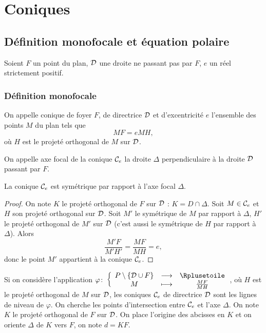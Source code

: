 \chapter{Coniques}
\minitoc
\minilof
\minilot
\section{Définition monofocale et équation polaire}
Soient $F$ un point du plan, $\mathcal{D}$ une droite ne passant pas par $F$, $e$ un réel strictement positif.
\subsection{Définition monofocale}
\begin{defdef}
   On appelle conique de foyer $F$, de directrice $\mathcal{D}$ et d'excentricité $e$ l'ensemble des points $M$ du plan tels que
  \begin{equation}
    MF=e MH,
  \end{equation}
  où $H$ est le projeté orthogonal de $M$ sur $\mathcal{D}$.
\end{defdef}
\begin{defdef}
  On appelle axe focal de la conique $\mathcal{C}_e$ la droite $\Delta$ perpendiculaire à la droite $\mathcal{D}$ passant par $F$.
\end{defdef}
\begin{prop}
  La conique $\mathcal{C}_e$ est symétrique par rapport à l'axe focal $\Delta$.
\end{prop}
\begin{proof}
  On note $K$ le projeté orthogonal de $F$ sur $\mathcal{D}$ : $K=D \cap \Delta$. Soit $M \in \mathcal{C}_e$ et $H$ son projeté orthogonal sur $\mathcal{D}$. Soit $M'$ le symétrique de $M$ par rapport à $\Delta$, $H'$ le projeté orthogonal de $M'$ sur $\mathcal{D}$ (c'est aussi le symétrique de $H$ par rapport à $\Delta$). Alors
\begin{equation}
  \frac{M'F}{M'H'} = \frac{MF}{MH} = e,
\end{equation}
donc le point $M'$ appartient à la conique $\mathcal{C}_e$.
\end{proof}
Si on considère l'application $\fonction{\varphi}{P\setminus\{\Dr \cup F\}}{\Rplusetoile}{M}{\frac{MF}{MH}}$, où $H$ est le projeté orthogonal de $M$ sur $\mathcal{D}$, les coniques $\mathcal{C}_e$ de directrice $\mathcal{D}$ sont les lignes de niveau de $\varphi$. On cherche les points d'intersection entre $\mathcal{C}_e$ et l'axe $\Delta$. On note $K$ le projeté orthogonal de $F$ sur $\mathcal{D}$. On place l'origine des abcisses en $K$ et on oriente $\Delta$ de $K$ vers $F$, on note $d=KF$. 

